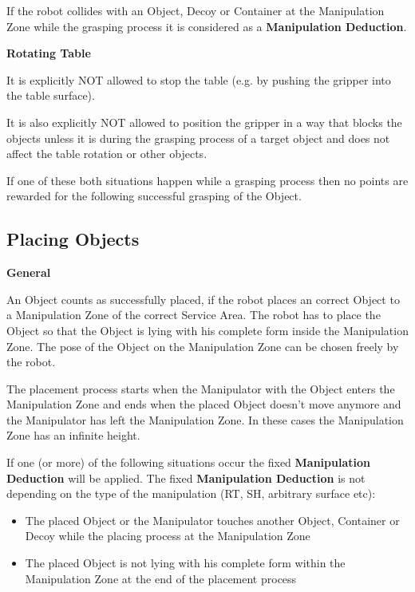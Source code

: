 If the robot collides with an Object, Decoy or Container at the Manipulation Zone while the grasping process it is considered as a \textbf{Manipulation Deduction}.

\textbf{Rotating Table}

It is explicitly NOT allowed to stop the table (e.g. by pushing the gripper into the table surface).

It is also explicitly NOT allowed to position the gripper in a way that blocks the objects 
unless it is during the grasping process of a target object and does not affect the table rotation or other objects.

If one of these both situations happen while a grasping process then no points are rewarded for the following successful grasping of the Object.

\subsection{Placing Objects} \label{ssec:PlacingObjects}

\textbf{General}

An Object counts as successfully placed, if the robot places an correct Object to a Manipulation Zone of the correct Service Area. The robot has to place the Object so that the Object is lying with his complete form inside the Manipulation Zone. The pose of the Object on the Manipulation Zone can be chosen freely by the robot.

The placement process starts when the Manipulator with the Object enters the Manipulation Zone and ends when the placed Object doesn't move anymore and the Manipulator has left the Manipulation Zone. In these cases the Manipulation Zone has an infinite height.

If one (or more) of the following situations occur the fixed \textbf{Manipulation Deduction} will be applied. The fixed \textbf{Manipulation Deduction} is not depending on the type of the manipulation (RT, SH, arbitrary surface etc):

\begin{itemize}
	\item The placed Object or the Manipulator touches another Object, Container or Decoy while the placing process at the Manipulation Zone 
	\item The placed Object is not lying with his complete form within the Manipulation Zone at the end of the placement process
\end{itemize}





